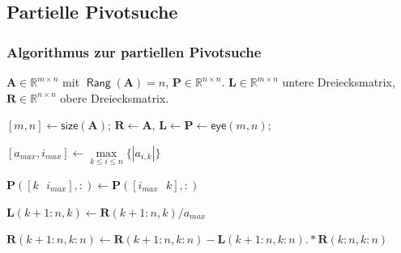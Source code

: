 \documentclass[10pt]{beamer} %
\DeclareMathOperator{\Rang}{\mathsf{Rang}}
\newcommand{\bfA}{{\mathbf A}}
\newcommand{\bfL}{{\mathbf L}}
\newcommand{\bfP}{{\mathbf P}}
\newcommand{\bfR}{{\mathbf R}}
\begin{document}
\subsection{Partielle Pivotsuche}
\begin{frame}
  \frametitle{Algorithmus zur partiellen Pivotsuche}

  \setcounter{algorithm}{0} %
  \begin{algorithm}[H]
  \caption{Partielle Pivotisierung%
    \label{alg:partial_pivoting}}
  \begin{algorithmic}[1]

		\REQUIRE $\bfA\in\mathbb{R}^{m\times n}$ mit $\Rang(\bfA)=n$, $\bfP\in\mathbb{R}^{n\times n}$.
		\ENSURE $\bfL\in\mathbb{R}^{m\times n}$ untere Dreiecksmatrix, $\bfR\in\mathbb{R}^{n\times n}$ obere Dreiecksmatrix.

		\STATE \alert<2>{$[m,n] \leftarrow \textsf{size}(\bfA)$;}
		\STATE \alert<3>{$\bfR \leftarrow \bfA$,} \alert<4>{$\bfL \leftarrow \bfP \leftarrow \textsf{eye}(m,n)$;}


			\STATE \alert<5>{$[a_{max},i_{max}] \leftarrow \max\limits_{k \leq i \leq n}\{|a_{i,k}|\}$}

				\STATE \alert<6>{$\bfP([k\textsf{ }i_{max}],:) \leftarrow \bfP([i_{max}\textsf{ }k],:)$}
			\ENDIF

			\STATE \alert<7>{$\bfL(k+1:n,k) \leftarrow \bfR(k+1:n,k)/a_{max}$}

			\STATE \alert<8>{$\bfR(k+1:n,k:n) \leftarrow \bfR(k+1:n,k:n) - \bfL(k+1:n,k:n).*\bfR(k:n,k:n)$}

		\ENDFOR
  \end{algorithmic}
\end{algorithm}

\end{frame}
\end{document}
